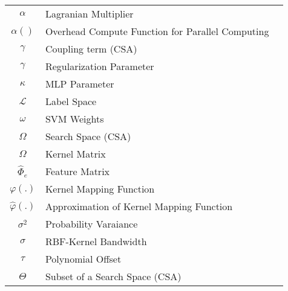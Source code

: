 \begin{longtable}{cll}
	$\alpha$ & Lagranian Multiplier& \\
	$\alpha()$ & Overhead Compute Function for Parallel Computing&\\
	$\gamma$ & Coupling term (CSA)&\\
	$\gamma$ & Regularization Parameter&\\
	$\kappa$& MLP Parameter&\\
	$\mathscr{L}$ & Label Space  & \\
	$\omega$& SVM Weights& \\
	$\Omega$& Search Space (CSA)&\\
	$\Omega$& Kernel Matrix&\\
	$\hat{\Phi}_e$&Feature Matrix&\\
	$\varphi(.)$ &Kernel Mapping Function& \\
	$\hat{\varphi}(.)$ &Approximation of Kernel Mapping Function& \\
	$\sigma^2$ & Probability Varaiance &\\
	$\sigma$ & RBF-Kernel Bandwidth &\\
	$\tau$ & Polynomial Offset&\\
	$\Theta$ & Subset of a Search Space (CSA)& \\
\end{longtable}




